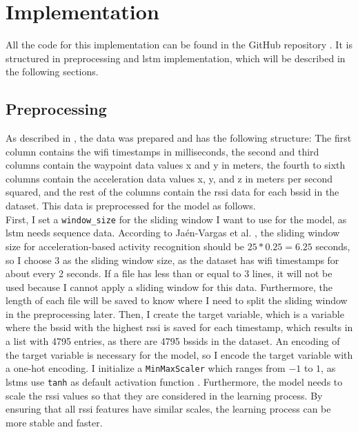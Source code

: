 \chapter{Implementation}\label{ch:implementation}


All the code for this implementation can be found in the GitHub repository \cite{github-repo}.
It is structured in preprocessing and \ac{lstm} implementation, which will be described in the following sections.

\section{Preprocessing}
As described in , the data was prepared and has the following structure:
The first column contains the \ac{wifi} timestamps in milliseconds, the second and third columns contain the waypoint data values x and y in meters, the fourth to sixth columns contain the acceleration data values x, y, and z in meters per second squared, and the rest of the columns contain the \ac{rssi} data for each \ac{bssid} in the dataset.
This data is preprocessed for the model as follows.\\
First, I set a \texttt{window\_size} for the sliding window I want to use for the model, as \ac{lstm} needs sequence data.
According to Ja{\'e}n-Vargas et al. \cite{EffectsSlidingWindow2022}, the sliding window size for acceleration-based activity recognition should be \(25 * 0.25 = 6.25\) seconds, so I choose \(3\) as the sliding window size, as the dataset has \ac{wifi} timestamps for about every 2 seconds.
If a file has less than or equal to \(3\) lines, it will not be used because I cannot apply a sliding window for this data.
Furthermore, the length of each file will be saved to know where I need to split the sliding window in the preprocessing later.
Then, I create the target variable, which is a variable where the \ac{bssid} with the highest \ac{rssi} is saved for each timestamp, which results in a list with 4795 entries, as there are 4795 \acp{bssid} in the dataset.
An encoding of the target variable is necessary for the model, so I encode the target variable with a one-hot encoding.
I initialize a \texttt{MinMaxScaler} which ranges from \(-1\) to \(1\), as \acp{lstm} use \texttt{tanh} as default activation function \cite{tanh-lstm-default}.
Furthermore, the model needs to scale the \ac{rssi} values so that they are considered in the learning process.
By ensuring that all \ac{rssi} features have similar scales, the learning process can be more stable and faster. 

